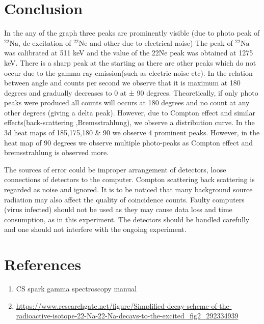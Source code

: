 \documentclass[a4paper, amsfonts, amssymb, amsmath, reprint, showkeys, nofootinbib, twoside]{revtex4-1}
\begin{document}
\section{Conclusion}
In the any of the graph three peaks are prominently visible (due to photo peak of $^{22}\text{Na}$, de-excitation of $^{22}\text{Ne}$ and other due to electrical noise) The peak of $^{22}\text{Na}$ was calibrated at 511 keV and the value of the 22Ne peak was obtained at 1275 keV. There is a sharp peak at the starting as there are other peaks which do not occur due to the gamma ray emission(such as electric noise etc).
In the relation between angle and counts per second we observe that it is maximum at 180 degrees and gradually decreases to 0 at ± 90 degrees. Theoretically, if only photo peaks were produced all counts will occurs at 180 degrees and no count at any other degrees (giving a delta peak). However, due to Compton effect and similar effects(back-scattering ,Bremsstrahlung), we observe a distribution curve.
In the 3d heat maps of 185,175,180 \& 90 we observe 4 prominent peaks. However, in the heat map of 90 degrees we observe multiple photo-peaks as Compton effect and bremsstrahlung is observed more.

The sources of error could be improper arrangement of detectors, loose connections of detectors to the computer. Compton scattering back scattering is regarded as noise and ignored. It is to be noticed that many background source radiation may also affect the quality of coincidence counts. Faulty computers (virus infected) should not be used as they may cause data loss and time consumption, as in this experiment. The detectors should be handled carefully and one should not interfere with the ongoing experiment.  

\section{References}
\begin{enumerate}
\item{CS spark gamma spectroscopy manual}
\item{\url{https://www.researchgate.net/figure/Simplified-decay-scheme-of-the-radioactive-isotope-22-Na-22-Na-decays-to-the-excited_fig2_292334939}}
\end{enumerate}
\end{document}
